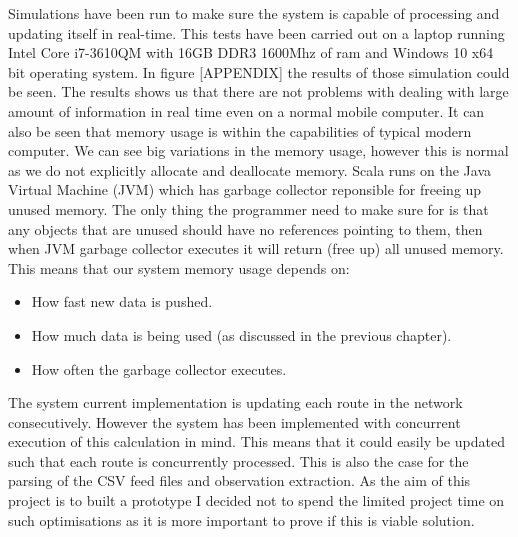 Simulations have been run to make sure the system is capable of processing and updating itself in real-time. This tests have been carried out on a laptop running Intel Core i7-3610QM with 16GB DDR3 1600Mhz of ram and Windows 10 x64 bit operating system. In figure [APPENDIX] the results of those simulation could be seen. The results shows us that there are not problems with dealing with large amount of information in real time even on a normal mobile computer. It can also be seen that memory usage is within the capabilities of typical modern computer. We can see big variations in the memory usage, however this is normal as we do not explicitly allocate and deallocate memory. Scala runs on the Java Virtual Machine (JVM) which has garbage collector reponsible for freeing up unused memory. The only thing the programmer need to make sure for is that any objects that are unused should have no references pointing to them, then when JVM garbage collector executes it will return (free  up) all unused memory. This means that our system memory usage depends on:
\begin{itemize}
	\item How fast new data is pushed.
	\item How much data is being used (as discussed in the previous chapter).
	\item How often the garbage collector executes.
\end{itemize}

The system current implementation is updating each route in the network consecutively. However the system has been implemented with concurrent execution of this calculation in mind. This means that it could easily be updated such that each route is concurrently processed. This is also the case for the parsing of the CSV feed files and observation extraction. As the aim of this project is to built a prototype I decided not to spend the limited project time on such optimisations as it is more important to prove if this is viable solution.